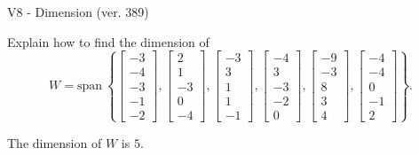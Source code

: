 \begin{exercise}
  \begin{exerciseTitle}V8 - Dimension (ver. 389)\end{exerciseTitle}
  \begin{exerciseStatement}
    Explain how to find the dimension of 
\[W=\mathrm{span}\ \left\{\left[\begin{array}{r}
-3 \\
-4 \\
-3 \\
-1 \\
-2
\end{array}\right] , \left[\begin{array}{r}
2 \\
1 \\
-3 \\
0 \\
-4
\end{array}\right] , \left[\begin{array}{r}
-3 \\
3 \\
1 \\
1 \\
-1
\end{array}\right] , \left[\begin{array}{r}
-4 \\
3 \\
-3 \\
-2 \\
0
\end{array}\right] , \left[\begin{array}{r}
-9 \\
-3 \\
8 \\
3 \\
4
\end{array}\right] , \left[\begin{array}{r}
-4 \\
-4 \\
0 \\
-1 \\
2
\end{array}\right]\right\}.\]



  \end{exerciseStatement}
  \begin{exerciseAnswer}
   The dimension of \(W\) is  \(5\).
  


  \end{exerciseAnswer}
\end{exercise}